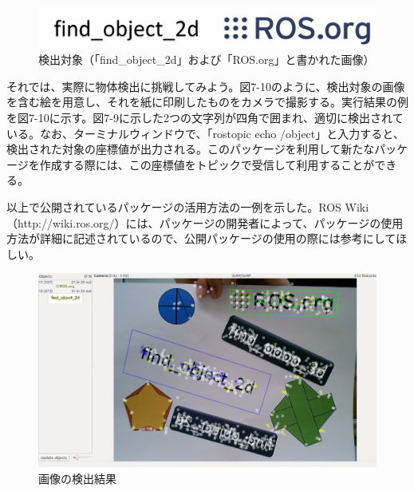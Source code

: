 \begin{figure}[htp]
  \centering
  \includegraphics[width=12cm]{pictures/chapter7/pic_07_09.png}
  \caption{検出対象（「find\_object\_2d」および「ROS.org」と書かれた画像）}
\end{figure}

それでは、実際に物体検出に挑戦してみよう。図7-10のように、検出対象の画像を含む絵を用意し、それを紙に印刷したものをカメラで撮影する。実行結果の例を図7-10に示す。図7-9に示した2つの文字列が四角で囲まれ、適切に検出されている。なお、ターミナルウィンドウで、「rostopic echo /object」と入力すると、検出された対象の座標値が出力される。このパッケージを利用して新たなパッケージを作成する際には、この座標値をトピックで受信して利用することができる。

以上で公開されているパッケージの活用方法の一例を示した。ROS Wiki（http://wiki.ros.org/）には、パッケージの開発者によって、パッケージの使用方法が詳細に記述されているので、公開パッケージの使用の際には参考にしてほしい。

\begin{figure}[htp]
  \centering
  \includegraphics[width=15cm]{pictures/chapter7/pic_07_10.png}
  \caption{画像の検出結果}
\end{figure}





